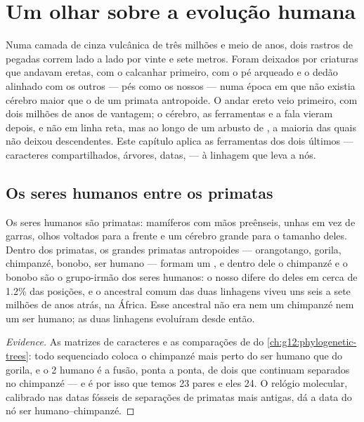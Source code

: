 \chapter{Um olhar sobre a evolução humana}\label{ch:g12:human-evolution}

Numa camada de cinza vulcânica de três milhões e meio de anos, dois
rastros de pegadas correm lado a lado por vinte e sete metros. Foram
deixados por criaturas que andavam eretas, com o calcanhar primeiro,
com o pé arqueado e o dedão alinhado com os outros --- pés como os
nossos --- numa época em que não existia cérebro maior que o de um
primata antropoide. O andar ereto veio primeiro, com dois milhões de
anos de vantagem; o cérebro, as ferramentas e a fala vieram depois, e
não em linha reta, mas ao longo de um arbusto de , a maioria
das quais não deixou descendentes. Este capítulo aplica as ferramentas
dos dois últimos --- caracteres compartilhados, árvores, datas,  ---
à linhagem que leva a nós.

\section{Os seres humanos entre os primatas}

\begin{proposition}\label{prop:g12:human-evolution:place}
Os seres humanos são primatas: mamíferos com mãos preênseis, unhas em
vez de garras, olhos voltados para a frente e um cérebro grande para o
tamanho deles. Dentro dos primatas, os grandes primatas antropoides ---
orangotango, gorila, chimpanzé, bonobo, ser humano --- formam um ,
e dentro dele o chimpanzé e o bonobo são o grupo-irmão dos seres
humanos: o nosso  difere do deles em cerca de 1.2\% das posições, e
o ancestral comum das duas linhagens viveu uns seis a sete milhões de
anos atrás, na África. Esse ancestral não era nem um chimpanzé nem um
ser humano; as duas linhagens evoluíram desde então.
\end{proposition}
\begin{proof}[Evidence]
As matrizes de caracteres e as comparações de  do
\cref{ch:g12:phylogenetic-trees}: todo  sequenciado coloca o
chimpanzé mais perto do ser humano que do gorila, e o  2
humano é a fusão, ponta a ponta, de dois  que continuam
separados no chimpanzé --- e é por isso que temos 23 pares e eles 24. O
relógio molecular, calibrado nas datas fósseis de separações de
primatas mais antigas, dá a data do nó ser humano--chimpanzé.
\end{proof}

